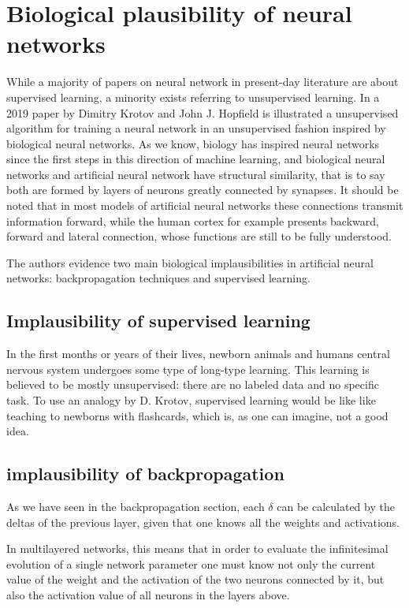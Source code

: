 \documentclass[a4paper]{report}
\begin{document}
\section{Biological plausibility of neural networks}
While a majority of papers on neural network in present-day literature are about supervised learning, a minority exists referring to unsupervised learning. In a 2019 paper by Dimitry Krotov and John J. Hopfield is illustrated a unsupervised algorithm for training a neural network in an unsupervised fashion inspired by biological neural networks. As we know, biology has inspired neural networks since the first steps in this direction of machine learning, and biological neural networks and artificial neural network have structural similarity, that is to say both are formed by layers of neurons greatly connected by synapses. It should be noted that in most models of artificial neural networks these connections transmit information forward, while the human cortex for example presents backward, forward and lateral connection, whose functions are still to be fully understood.

The authors evidence two main biological implausibilities in artificial neural networks: backpropagation techniques and supervised learning.

\subsection{Implausibility of supervised learning}

In the first months or years of their lives, newborn animals and humans central nervous system undergoes some type of long-type learning. This learning is believed to be mostly unsupervised: there are no labeled data and no specific task.  To use an analogy by D. Krotov, supervised learning would be like like teaching to newborns with flashcards, which is, as one can imagine, not a good idea.

\subsection{implausibility of backpropagation}
As we have seen in the backpropagation section, each $\delta$ can be calculated by the deltas of the previous layer, given that one knows all the weights and activations.


In multilayered networks, this means that in order to evaluate the infinitesimal evolution of a single network parameter one must know not only the current value of the weight and the activation of the two neurons connected by it, but also the activation value of all neurons in the layers above.
\end{document}

